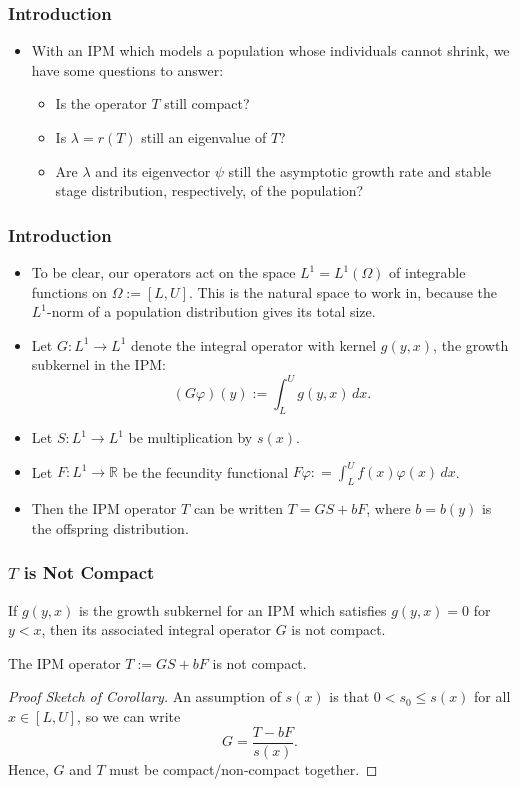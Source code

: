 \documentclass{beamer}
\newcommand{\R}{\mathbb{R}}
\begin{document}
\begin{frame}
	\frametitle{Introduction}
	\begin{itemize}
		\item With an IPM which models a population whose individuals cannot shrink, we have some questions to answer:
		\pause
		\begin{itemize}
			\item Is the operator $T$ still compact?
			\pause
			\item Is $\lambda = r(T)$ still an eigenvalue of $T$?
			\pause
			\item Are $\lambda$ and its eigenvector $\psi$ still the asymptotic growth rate and stable stage distribution, respectively, of the population?
		\end{itemize}
	\end{itemize}
\end{frame}

\begin{frame}
	\frametitle{Introduction}
	\begin{itemize}
		\item To be clear, our operators act on the space $L^1 = L^1(\Omega)$ of integrable functions on $\Omega:=[L,U]$. This is the natural space to work in, because the $L^1$-norm of a population distribution gives its total size.
		\pause
		\item Let $G:L^1 \to L^1$ denote the integral operator with kernel $g(y, x)$, the growth subkernel in the IPM:
		\pause
		\[(G\varphi)(y) := \int_L^U g(y, x) \, dx.\]
		\pause
		\item Let $S:L^1 \to L^1$ be multiplication by $s(x)$.
		\pause
		\item Let $F : L^1 \to \R$ be the fecundity functional $F\varphi : = \int_L^U f(x) \varphi(x) \, dx$.
		\pause
		\item Then the IPM operator $T$ can be written $T = GS + bF$, where $b = b(y)$ is the offspring distribution.
	\end{itemize}
\end{frame}

\begin{frame}
	\frametitle{$T$ is Not Compact}
		\begin{theorem}[Reichenbach, 2018]
			If $g(y, x)$ is the growth subkernel for an IPM which satisfies $g(y, x) = 0$ for $y < x$, then its associated integral operator $G$ is not compact.
		\end{theorem}
	\pause
	\begin{corollary}
		The IPM operator $T:= GS + bF$ is not compact.
	\end{corollary}
	\pause
	\begin{proof}[Proof Sketch of Corollary]
		An assumption of $s(x)$ is that $0 < s_0 \leq s(x)$ for all $x \in [L, U]$, so we can write
		\[G = \frac{T - bF}{s(x)}.\]
		Hence, $G$ and $T$ must be compact/non-compact together.
	\end{proof}
\end{frame}
\end{document}
